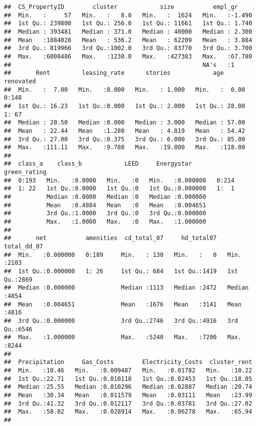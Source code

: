 \documentclass[
]{article}
\begin{document}
\begin{verbatim}
##  CS_PropertyID        cluster            size           empl_gr      
##  Min.   :     57   Min.   :   8.0   Min.   :  1624   Min.   :-1.490  
##  1st Qu.: 239800   1st Qu.: 256.0   1st Qu.: 11661   1st Qu.: 1.740  
##  Median : 393481   Median : 371.0   Median : 40000   Median : 2.300  
##  Mean   :1084028   Mean   : 536.2   Mean   : 62209   Mean   : 3.884  
##  3rd Qu.: 819966   3rd Qu.:1002.0   3rd Qu.: 83770   3rd Qu.: 3.700  
##  Max.   :6008486   Max.   :1230.0   Max.   :427383   Max.   :67.780  
##                                                      NA's   :1       
##       Rent         leasing_rate      stories            age         renovated
##  Min.   :  7.00   Min.   :0.000   Min.   : 1.000   Min.   :  0.00   0:148    
##  1st Qu.: 16.23   1st Qu.:0.000   1st Qu.: 2.000   1st Qu.: 28.00   1: 67    
##  Median : 20.50   Median :0.000   Median : 3.000   Median : 57.00            
##  Mean   : 22.44   Mean   :1.280   Mean   : 4.819   Mean   : 54.42            
##  3rd Qu.: 27.00   3rd Qu.:0.375   3rd Qu.: 6.000   3rd Qu.: 85.00            
##  Max.   :111.11   Max.   :9.780   Max.   :19.000   Max.   :118.00            
##                                                                              
##  class_a    class_b            LEED     Energystar       green_rating
##  0:193   Min.   :0.0000   Min.   :0   Min.   :0.000000   0:214       
##  1: 22   1st Qu.:0.0000   1st Qu.:0   1st Qu.:0.000000   1:  1       
##          Median :0.0000   Median :0   Median :0.000000               
##          Mean   :0.4884   Mean   :0   Mean   :0.004651               
##          3rd Qu.:1.0000   3rd Qu.:0   3rd Qu.:0.000000               
##          Max.   :1.0000   Max.   :0   Max.   :1.000000               
##                                                                      
##       net           amenities  cd_total_07     hd_total07    total_dd_07  
##  Min.   :0.000000   0:189     Min.   : 130   Min.   :   0   Min.   :2103  
##  1st Qu.:0.000000   1: 26     1st Qu.: 684   1st Qu.:1419   1st Qu.:2869  
##  Median :0.000000             Median :1113   Median :2472   Median :4854  
##  Mean   :0.004651             Mean   :1676   Mean   :3141   Mean   :4816  
##  3rd Qu.:0.000000             3rd Qu.:2746   3rd Qu.:4916   3rd Qu.:6546  
##  Max.   :1.000000             Max.   :5240   Max.   :7200   Max.   :8244  
##                                                                           
##  Precipitation     Gas_Costs        Electricity_Costs  cluster_rent  
##  Min.   :10.46   Min.   :0.009487   Min.   :0.01782   Min.   :10.22  
##  1st Qu.:22.71   1st Qu.:0.010118   1st Qu.:0.02453   1st Qu.:18.05  
##  Median :25.55   Median :0.010296   Median :0.02887   Median :20.74  
##  Mean   :30.34   Mean   :0.011579   Mean   :0.03111   Mean   :23.99  
##  3rd Qu.:41.32   3rd Qu.:0.012117   3rd Qu.:0.03781   3rd Qu.:27.02  
##  Max.   :58.02   Max.   :0.028914   Max.   :0.06278   Max.   :65.94  
## 
\end{verbatim}
\end{document}
